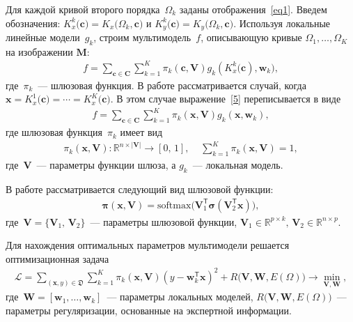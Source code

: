 \documentclass[12pt]{a&t}
\begin{document}
Для каждой кривой второго порядка~$\Omega_k$ заданы отображения~\eqref{eq1}. Введем обозначения: $K_x^k\bigr(\mathbf{c}\bigr) = K_x\bigr(\Omega_k, \mathbf{c}\bigr)$ и $K_y^k\bigr(\mathbf{c}\bigr) = K_y\bigr(\Omega_k, \mathbf{c}\bigr)$. Используя локальные линейные модели~$g_k$, строим мультимодель~$f$, описывающую кривые $\Omega_1, \dots, \Omega_K$ на изображении $\mathbf{M}$:
\begin{gather}
\label{5}
	f = \sum\limits_{\mathbf{c} \in \mathbf{C}} \sum_{k = 1}^{K} \pi_k(\mathbf{c}, \mathbf{V})g_k(K^k_{x}\bigl(\mathbf{c}), \mathbf{w}_k), 
\end{gather}
где~$\pi_k$~--- шлюзовая функция. В работе рассматривается случай, когда~$\mathbf{x}=K^1_{x}\bigl(\mathbf{c})=\cdots=K^K_{x}\bigl(\mathbf{ c}).$ В этом случае выражение~\eqref{5} переписывается в виде
\begin{gather}
\label{5_1}
	f = \sum\limits_{\mathbf{c} \in \mathbf{C}} \sum_{k = 1}^{K} \pi_k(\mathbf{x}, \mathbf{V})g_k(\mathbf{x}, \mathbf{w}_k), 
\end{gather}
где шлюзовая функция~$\pi_k$ имеет вид
\begin{gather}
\label{6}
	\pi_k(\mathbf{x}, \mathbf{V}): \mathbb{R}^{n\times |\mathbf{V}|} \rightarrow [0, \, 1], \; \; \; \; \sum\limits_{k = 1}^{K}\pi_k(\mathbf{x}, \mathbf{V}) = 1,
\end{gather}
где~$\mathbf{V}$~--- параметры функции шлюза, а $g_k$~--- локальная модель.

В работе рассматривается следующий вид шлюзовой функции:
\begin{gather}
    \boldsymbol{\pi}(\mathbf{x}, \mathbf{V}) = \text{softmax}\bigl(\mathbf{V}_1^{\mathsf{T}}\boldsymbol{\sigma}(\mathbf{V}_2^{\mathsf{T}}\mathbf{x}) \bigr),
\end{gather}
где~$\mathbf{V} = \{\mathbf{V}_1, \, \mathbf{V}_2\}$~--- параметры шлюзовой функции, $\mathbf{V}_1 \in \mathbb{R}^{p \times k}, \, \mathbf{V}_2 \in \mathbb{R}^{n \times p}$.

Для нахождения оптимальных параметров мультимодели решается оптимизационная задача
\begin{gather}
\label{9}
\mathcal{L} = \sum\limits_{(\mathbf{x}, y) \in \mathfrak{D}} \sum\limits_{k = 1}^{K} \pi_k(\mathbf{x}, \mathbf{V})(y - \mathbf{w}_k^{\mathsf{T}}\mathbf{x})^2 + R\bigl(\mathbf{V}, \mathbf{W}, E(\Omega)\bigr) \rightarrow \min_{\mathbf{V}, \mathbf{W}},
\end{gather}
где~$\mathbf{W} = [\mathbf{w}_1, \dots, \mathbf{w}_k]$~--- параметры локальных моделей, $R\bigl(\mathbf{V}, \mathbf{W}, E(\Omega)\bigr)$~--- параметры регуляризации, основанные на экспертной информации.
\end{document}

